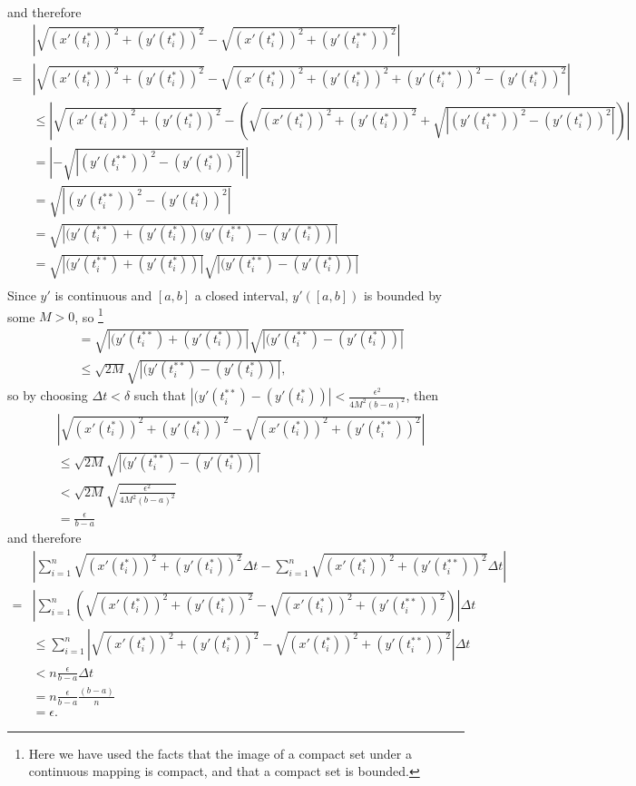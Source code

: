 \documentclass[12pt,letterpaper,reqno]{article}
\numberwithin{equation}{section}
\begin{document}
{\begin{pf}
\begin{align*}
\end{align*}
and therefore
\begin{align*}
	&\left|\sqrt{(x'(t_i^*))^2+(y'(t_i^{*}))^2}-\sqrt{(x'(t_i^*))^2+(y'(t_i^{**}))^2}\right|\\
	=& \left|\sqrt{(x'(t_i^*))^2+(y'(t_i^{*}))^2}-\sqrt{(x'(t_i^*))^2+(y'(t_i^{*}))^2+(y'(t_i^{**}))^2-(y'(t_i^{*}))^2}\right| \\
	& \leq \left|\sqrt{(x'(t_i^*))^2+(y'(t_i^{*}))^2}-\left(\sqrt{(x'(t_i^*))^2+(y'(t_i^{*}))^2}+\sqrt{|(y'(t_i^{**}))^2-(y'(t_i^{*}))^2|}\right)\right| \\
	&=\left|-\sqrt{|(y'(t_i^{**}))^2-(y'(t_i^{*}))^2|}\right| \\
	&=\sqrt{|(y'(t_i^{**}))^2-(y'(t_i^{*}))^2|} \\
	&=\sqrt{|(y'(t_i^{**})+(y'(t_i^{*}))(y'(t_i^{**})-(y'(t_i^{*}))|} \\
	&=\sqrt{|(y'(t_i^{**})+(y'(t_i^{*}))|}\sqrt{|(y'(t_i^{**})-(y'(t_i^{*}))|} \\
\end{align*}
Since $y'$ is continuous and $[a,b]$ a closed interval, $y'([a,b])$ is bounded by some $M>0$, so \footnote{Here we have used the facts that the image of a compact set under a continuous mapping is compact, and that a compact set is bounded.}
\begin{align*}
	&=\sqrt{|(y'(t_i^{**})+(y'(t_i^{*}))|}\sqrt{|(y'(t_i^{**})-(y'(t_i^{*}))|} \\
	&\leq \sqrt{2M}\sqrt{|(y'(t_i^{**})-(y'(t_i^{*}))|},
\end{align*}
so by choosing $\Delta t<\delta$ such that $|(y'(t_i^{**})-(y'(t_i^{*}))|<\frac{\epsilon^2}{4M^2(b-a)^2}$, then 
\begin{align*}
	&\left|\sqrt{(x'(t_i^*))^2+(y'(t_i^{*}))^2}-\sqrt{(x'(t_i^*))^2+(y'(t_i^{**}))^2}\right|\\
	&\leq \sqrt{2M}\sqrt{|(y'(t_i^{**})-(y'(t_i^{*}))|} \\
	&< \sqrt{2M}\sqrt{\frac{\epsilon^2}{4M^2(b-a)^2}} \\
	&=\frac{\epsilon}{b-a}
\end{align*}
and therefore
\begin{align*}
	&\left|\sum_{i=1}^n\sqrt{(x'(t_i^*))^2+(y'(t_i^{*}))^2}\Delta t-\sum_{i=1}^n\sqrt{(x'(t_i^*))^2+(y'(t_i^{**}))^2}\Delta t\right| \\
	=&\left|\sum_{i=1}^n\left(\sqrt{(x'(t_i^*))^2+(y'(t_i^{*}))^2}-\sqrt{(x'(t_i^*))^2+(y'(t_i^{**}))^2}\right)\right|\Delta t \\
	&\leq \sum_{i=1}^n\left|\sqrt{(x'(t_i^*))^2+(y'(t_i^{*}))^2}-\sqrt{(x'(t_i^*))^2+(y'(t_i^{**}))^2}\right|\Delta t \\
	&<n\frac{\epsilon}{b-a} \Delta t \\
	&=n\frac{\epsilon}{b-a}\frac{(b-a)}{n} \\
	&=\epsilon.
\end{align*}
\end{pf}

}
\end{document}

